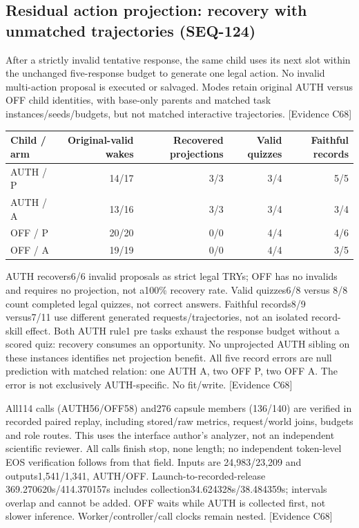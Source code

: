 \documentclass[11pt]{article}
\newcommand{\ev}[1]{\textsf{[Evidence #1]}}
\begin{document}
\subsection{Residual action projection: recovery with unmatched trajectories (SEQ-124)}
After a strictly invalid tentative response, the same child uses its next
slot within the unchanged five-response budget to generate one legal action.
No invalid multi-action proposal is executed or salvaged. Modes retain original
AUTH versus OFF child identities, with base-only parents and matched task
instances/seeds/budgets, but not matched interactive trajectories. \ev{C68}

\begin{center}\small
\begin{tabular}{lrrrr}
\toprule
Child / arm & Original-valid wakes & Recovered projections & Valid quizzes & Faithful records \\
\midrule
AUTH / P & 14/17 & 3/3 & 3/4 & 5/5 \\
AUTH / A & 13/16 & 3/3 & 3/4 & 3/4 \\
OFF / P & 20/20 & 0/0 & 4/4 & 4/6 \\
OFF / A & 19/19 & 0/0 & 4/4 & 3/5 \\
\bottomrule
\end{tabular}
\end{center}

AUTH recovers6/6 invalid proposals as strict legal TRYs; OFF has no invalids
and requires no projection, not a100\% recovery rate. Valid quizzes6/8 versus
8/8 count completed legal quizzes, not correct answers. Faithful records8/9
versus7/11 use different generated requests/trajectories, not an isolated
record-skill effect. Both AUTH rule1 pre tasks exhaust the response budget
without a scored quiz: recovery consumes an opportunity. No unprojected AUTH
sibling on these instances identifies net projection benefit. All five record
errors are null prediction with matched relation: one AUTH A, two OFF P,
two OFF A. The error is not exclusively AUTH-specific. No fit/write. \ev{C68}

All114 calls (AUTH56/OFF58) and276 capsule members (136/140) are verified in
recorded paired replay, including stored/raw metrics, request/world joins,
budgets and role routes. This uses the interface author's analyzer, not an
independent scientific reviewer. All calls finish stop, none length; no
independent token-level EOS verification follows from that field. Inputs are
24{,}983/23{,}209 and outputs1{,}541/1{,}341, AUTH/OFF. Launch-to-recorded-release
369.270620s/414.370157s includes collection34.624328s/38.484359s; intervals overlap
and cannot be added. OFF waits while AUTH is collected first, not slower
inference. Worker/controller/call clocks remain nested. \ev{C68}
\end{document}
